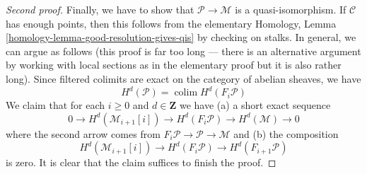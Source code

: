 \documentclass{stacks-project}
\theoremstyle{plain}
\theoremstyle{definition}
\theoremstyle{remark}
\numberwithin{equation}{subsection}
\def\colim{\mathop{\mathrm{colim}}\nolimits}
\begin{document}
\begin{proof}[Second proof]
\medskip\noindent
Finally, we have to show that $\mathcal{P} \to \mathcal{M}$
is a quasi-isomorphism. If $\mathcal{C}$ has enough points, then
this follows from the elementary
Homology, Lemma \ref{homology-lemma-good-resolution-gives-qis}
by checking on stalks. In general, we can argue as follows
(this proof is far too long --- there is an alternative argument by
working with local sections as in the elementary proof but it
is also rather long).
Since filtered colimits are exact on the category of abelian
sheaves, we have
$$
H^d(\mathcal{P}) = \colim H^d(F_i\mathcal{P})
$$
We claim that for each $i \geq 0$ and $d \in \mathbf{Z}$
we have (a) a short exact sequence
$$
0 \to H^d(\mathcal{M}_{i + 1}[i]) \to
H^d(F_i\mathcal{P}) \to H^d(\mathcal{M}) \to 0
$$
where the second arrow comes from
$F_i\mathcal{P} \to \mathcal{P} \to \mathcal{M}$
and (b) the composition
$$
H^d(\mathcal{M}_{i + 1}[i]) \to
H^d(F_i\mathcal{P}) \to
H^d(F_{i + 1}\mathcal{P})
$$
is zero. It is clear that the claim suffices to finish the proof.


\end{proof}
\end{document}
